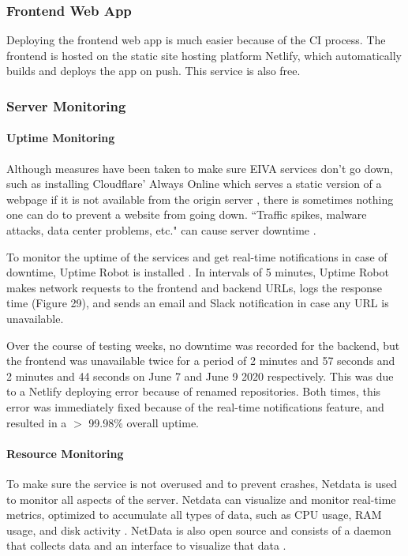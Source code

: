 \documentclass{article}
\begin{document}
\subsubsection{Frontend Web App}

Deploying the frontend web app is much easier because of the CI process. The frontend is hosted on the static site hosting platform Netlify, which automatically builds and deploys the app on push. This service is also free.

\subsubsection{Server Monitoring}

\paragraph{Uptime Monitoring}

Although measures have been taken to make sure EIVA services don't go down, such as installing Cloudflare' Always Online which serves a static version of a webpage if it is not available from the origin server \cite{noauthor_keep_nodate}, there is sometimes nothing one can do to prevent a website from going down. ``Traffic spikes, malware attacks, data center problems, etc." can cause server downtime \cite{noauthor_what_2018}.

To monitor the uptime of the services and get real-time notifications in case of downtime, Uptime Robot is installed \cite{noauthor_about_nodate}. In intervals of 5 minutes, Uptime Robot makes network requests to the frontend and backend URLs, logs the response time (Figure 29), and sends an email and Slack notification in case any URL is unavailable.

Over the course of testing weeks, no downtime was recorded for the backend, but the frontend was unavailable twice for a period of 2 minutes and 57 seconds and 2 minutes and 44 seconds on June 7 and June 9 2020 respectively. This was due to a Netlify deploying error because of renamed repositories. Both times, this error was immediately fixed because of the real-time notifications feature, and resulted in a $>$ 99.98\% overall uptime.

\paragraph{Resource Monitoring}

To make sure the service is not overused and to prevent crashes, Netdata is used to monitor all aspects of the server. Netdata can visualize and monitor real-time metrics, optimized to accumulate all types of data, such as CPU usage, RAM usage, and disk activity \cite{noauthor_netdata_nodate}. NetData is also open source and consists of a daemon that collects data and an interface to visualize that data \cite{noauthor_netdata/netdata_2020}.
\end{document}
